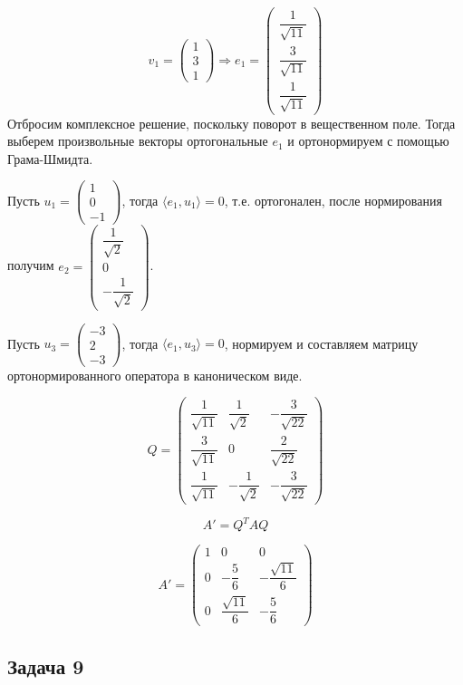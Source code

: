 \documentclass[a4paper,12pt]{article}
\begin{document}
\[
v_1 = \begin{pmatrix}
    1 \\ 3 \\ 1
\end{pmatrix} \Rightarrow e_1 = \begin{pmatrix}
    \dfrac{1}{\sqrt{11}} \\[6pt]
    \dfrac{3}{\sqrt{11}} \\[6pt]
    \dfrac{1}{\sqrt{11}}
\end{pmatrix}
\]
Отбросим комплексное решение, поскольку поворот в вещественном поле. Тогда выберем произвольные векторы ортогональные \( e_1 \) и ортонормируем с помощью Грама-Шмидта.

Пусть \( u_1 = \begin{pmatrix} 1 \\ 0 \\ -1 \end{pmatrix} \), тогда \( \langle e_1, u_1 \rangle = 0 \), т.е. ортогонален, после нормирования получим \( e_2 = \begin{pmatrix} \dfrac{1}{\sqrt{2}} \\ 0 \\ -\dfrac{1}{\sqrt{2}} \end{pmatrix} \).

Пусть \( u_3 = \begin{pmatrix} -3 \\ 2 \\ -3 \end{pmatrix} \), тогда \( \langle e_1, u_3 \rangle = 0 \), нормируем и составляем матрицу ортонормированного оператора в каноническом виде. 

\[
Q =
\begin{pmatrix}
\dfrac{1}{\sqrt{11}} & \dfrac{1}{\sqrt{2}} & -\dfrac{3}{\sqrt{22}} \\
\dfrac{3}{\sqrt{11}} & 0 & \dfrac{2}{\sqrt{22}} \\
\dfrac{1}{\sqrt{11}} & -\dfrac{1}{\sqrt{2}} & -\dfrac{3}{\sqrt{22}}
\end{pmatrix}
\]

\[
A' = Q^T A Q
\]

\[
A' =
\begin{pmatrix}
1 & 0 & 0 \\
0 & -\dfrac{5}{6} & -\dfrac{\sqrt{11}}{6} \\
0 & \dfrac{\sqrt{11}}{6} & -\dfrac{5}{6}
\end{pmatrix}
\]

\subsection{Задача 9}
\end{document}
